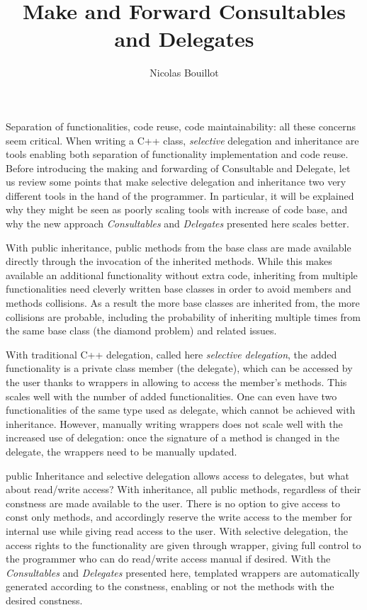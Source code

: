 \documentclass{article}
\begin{document}
\title{Make and Forward Consultables and Delegates}
\author{Nicolas Bouillot}
\maketitle

Separation of functionalities, code reuse, code maintainability: all these concerns seem critical. When writing a C++ class, \textit{selective} delegation and inheritance are tools enabling both separation of functionality implementation and code reuse. Before introducing the making and forwarding of Consultable and Delegate, let us review some points that make selective delegation and inheritance two very different tools in the hand of the programmer. In particular, it will be explained why they might be seen as poorly scaling tools with increase of code base, and why the new approach \textit{Consultables} and \textit{Delegates} presented here scales better.

With public inheritance, public methods from the base class are made available directly through the invocation of the inherited methods. While this makes available an additional functionality without extra code, inheriting from multiple functionalities need cleverly written base classes in order to avoid members and methods collisions. As a result the more base classes are inherited from, the more collisions are probable, including the probability of inheriting multiple times from the same base class (the diamond problem) and related issues.

With traditional C++ delegation, called here \textit{selective delegation}, the added functionality is a private class member (the delegate), which can be accessed by the user thanks to wrappers in allowing to access the member's methods. This scales well with the number of added functionalities. One can even have two functionalities of the same type used as delegate, which cannot be achieved with inheritance. However, manually writing wrappers does not scale well with the increased use of delegation: once the signature of a method is changed in the delegate, the wrappers need to be manually updated.  
 
public Inheritance and selective delegation allows access to delegates, but what about read/write access? With inheritance, all public methods, regardless of their constness are made available to the user. There is no option to give access to const only methods, and accordingly reserve the write access to the member for internal use while giving read access to the user. With selective delegation, the access rights to the functionality are given through wrapper, giving full control to the programmer who can do read/write access manual if desired. With the \textit{Consultables} and \textit{Delegates} presented here, templated wrappers are automatically generated according to the constness, enabling or not the methods with the desired constness. 
\end{document}
